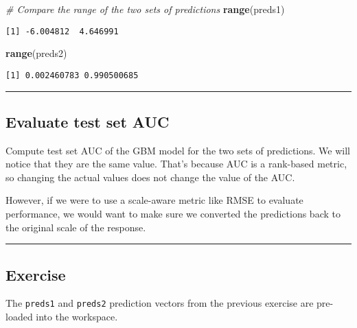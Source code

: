 \documentclass[
]{book}
\newenvironment{Shaded}{\begin{snugshade}}{\end{snugshade}}
\newcommand{\CommentTok}[1]{\textcolor[rgb]{0.56,0.35,0.01}{\textit{#1}}}
\newcommand{\KeywordTok}[1]{\textcolor[rgb]{0.13,0.29,0.53}{\textbf{#1}}}
\newcommand{\NormalTok}[1]{#1}
\begin{document}
\begin{Shaded}
\begin{Highlighting}[]
\CommentTok{# Compare the range of the two sets of predictions}
\KeywordTok{range}\NormalTok{(preds1)}
\end{Highlighting}
\end{Shaded}

\begin{verbatim}
[1] -6.004812  4.646991
\end{verbatim}

\begin{Shaded}
\begin{Highlighting}[]
\KeywordTok{range}\NormalTok{(preds2)}
\end{Highlighting}
\end{Shaded}

\begin{verbatim}
[1] 0.002460783 0.990500685
\end{verbatim}

\begin{center}\rule{0.5\linewidth}{0.5pt}\end{center}

\hypertarget{evaluate-test-set-auc-1}{%
\subsection{Evaluate test set AUC}\label{evaluate-test-set-auc-1}}

Compute test set AUC of the GBM model for the two sets of predictions. We will notice that they are the same value. That's because AUC is a rank-based metric, so changing the actual values does not change the value of the AUC.

However, if we were to use a scale-aware metric like RMSE to evaluate performance, we would want to make sure we converted the predictions back to the original scale of the response.

\begin{center}\rule{0.5\linewidth}{0.5pt}\end{center}

\hypertarget{exercise-24}{%
\subsection*{Exercise}\label{exercise-24}}

The \texttt{preds1} and \texttt{preds2} prediction vectors from the previous exercise are pre-loaded into the workspace.
\end{document}
